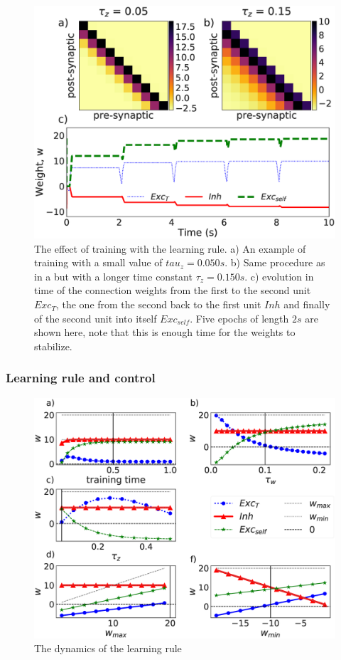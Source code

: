 \documentclass{esannV2}
\begin{document}
\begin{figure}[h!]
\centering
\includegraphics[scale=0.3]{training_rule.eps}
\caption{The effect of training with the learning rule. a) An example of training with a small value of $tau_z=0.050s$. b) Same procedure as in a but with a longer time constant $\tau_z=0.150s$. c) evolution in time of the connection weights from the first to the second unit $Exc_T$, the one from the second back to the first unit $Inh$ and finally of the second unit into itself $Exc_{self}$. Five epochs of length $2s$ are shown here, note that this is enough time for the weights to stabilize.}\label{Fig:epochs}
\end{figure}



\subsubsection{Learning rule and control}


\begin{figure}[h!]
\centering
\includegraphics[scale=0.3]{training_rule_quantities_pre_rule_True.eps}
\caption{The dynamics of the learning rule}\label{Fig:learning_quantities_pre}
\end{figure}
\end{document}
